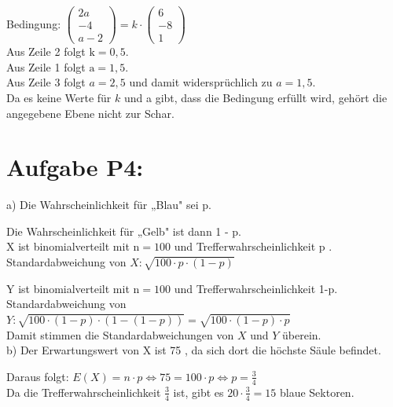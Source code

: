 \documentclass[10pt]{article}
\begin{document}
Bedingung: $\left(\begin{array}{c}2 a \\ -4 \\ a-2\end{array}\right)=k \cdot\left(\begin{array}{c}6 \\ -8 \\ 1\end{array}\right)$\\
Aus Zeile 2 folgt $\mathrm{k}=0,5$.\\
Aus Zeile 1 folgt $\mathrm{a}=1,5$.\\
Aus Zeile 3 folgt $a=2,5$ und damit widersprüchlich zu $a=1,5$.\\
Da es keine Werte für $k$ und a gibt, dass die Bedingung erfüllt wird, gehört die angegebene Ebene nicht zur Schar.

\section*{Aufgabe P4:}
a) Die Wahrscheinlichkeit für „Blau" sei p.

Die Wahrscheinlichkeit für „Gelb" ist dann 1 - p.\\
X ist binomialverteilt mit $\mathrm{n}=100$ und Trefferwahrscheinlichkeit p .\\
Standardabweichung von $X: \sqrt{100 \cdot p \cdot(1-p)}$

Y ist binomialverteilt mit $\mathrm{n}=100$ und Trefferwahrscheinlichkeit 1-p.\\
Standardabweichung von $Y: \sqrt{100 \cdot(1-p) \cdot(1-(1-p))}=\sqrt{100 \cdot(1-p) \cdot p}$\\
Damit stimmen die Standardabweichungen von $X$ und $Y$ überein.\\
b) Der Erwartungswert von X ist 75 , da sich dort die höchste Säule befindet.

Daraus folgt: $E(X)=n \cdot p \Leftrightarrow 75=100 \cdot p \Leftrightarrow p=\frac{3}{4}$\\
Da die Trefferwahrscheinlichkeit $\frac{3}{4}$ ist, gibt es $20 \cdot \frac{3}{4}=15$ blaue Sektoren.
\end{document}
